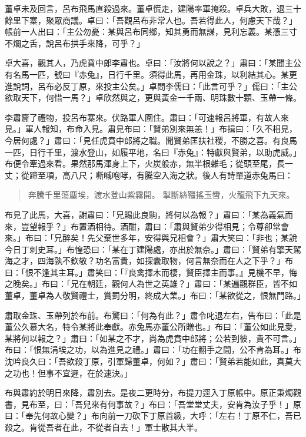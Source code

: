 董卓未及回言，呂布飛馬直殺過來。董卓慌走，建陽率軍掩殺。卓兵大敗，退三十餘里下寨，聚眾商議。卓曰：「吾觀呂布非常人也。吾若得此人，何慮天下哉？」帳前一人出曰：「主公勿憂：某與呂布同鄉，知其勇而無謀，見利忘義。某憑三寸不爛之舌，說呂布拱手來降，可乎？」

卓大喜，觀其人，乃虎賁中郎李肅也。卓曰：「汝將何以說之？」肅曰：「某聞主公有名馬一匹，號曰『赤兔』，日行千里。須得此馬，再用金珠，以利結其心。某更進說詞，呂布必反丁原，來投主公矣。」卓問李儒曰：「此言可乎？」儒曰：「主公欲取天下，何惜一馬？」卓欣然與之，更與黃金一千兩、明珠數十顆、玉帶一條。

李肅齎了禮物，投呂布寨來。伏路軍人圍住。肅曰：「可速報呂將軍，有故人來見。」軍人報知，布命入見。肅見布曰：「賢弟別來無恙！」布揖曰：「久不相見，今居何處？」肅曰：「見任虎賁中郎將之職。聞賢弟匡扶社稷，不勝之喜。有良馬一匹，日行千里，渡水登山，如履平地，名曰『赤兔』：特獻與賢弟，以助虎威。」布便令牽過來看。果然那馬渾身上下，火炭般赤，無半根雜毛；從頭至尾，長一丈；從蹄至項，高八尺；嘶喊咆哮，有騰空入海之狀。後人有詩單道赤兔馬曰：

\begin{quote}
奔騰千里蕩塵埃，渡水登山紫霧開。
掣斷絲韁搖玉轡，火龍飛下九天來。
\end{quote}

布見了此馬，大喜，謝肅曰：「兄賜此良駒，將何以為報？」肅曰：「某為義氣而來，豈望報乎？」布置酒相待。酒酣，肅曰：「肅與賢弟少得相見；令尊卻常會來。」布曰：「兄醉矣！先父棄世多年，安得與兄相會？」肅大笑曰：「非也；某說今日丁刺史耳。」布惶恐曰：「某在丁建陽處，亦出於無奈。」肅曰：「賢弟有擎天駕海之才，四海孰不欽敬？功名富貴，如探囊取物，何言無奈而在人之下乎？」布曰：「恨不逢其主耳。」肅笑曰：「『良禽擇木而棲，賢臣擇主而事。』見機不早，悔之晚矣。」布曰：「兄在朝廷，觀何人為世之英雄？」肅曰：「某遍觀群臣，皆不如董卓，董卓為人敬賢禮士，賞罰分明，終成大業。」布曰：「某欲從之，恨無門路。」

肅取金珠、玉帶列於布前。布驚曰：「何為有此？」肅令叱退左右，告布曰：「此是董公久慕大名，特令某將此奉獻。赤兔馬亦董公所贈也。」布曰：「董公如此見愛，某將何以報之？」肅曰：「如某之不才，尚為虎賁中郎將；公若到彼，貴不可言。」布曰：「恨無涓埃之功，以為進見之禮。」肅曰：「功在翻手之間，公不肯為耳。」布沈吟良久曰：「吾欲殺丁原，引軍歸董卓，何如？」肅曰：「賢弟若能如此，真莫大之功也！但事不宜遲，在於速決。」

布與肅約於明日來降，肅別去。是夜二更時分，布提刀逕入丁原帳中。原正秉燭觀書，見布至，曰：「吾兒來有何事故？」布曰：「吾堂堂丈夫，安肯為汝子乎！」原曰：「奉先何故心變？」布向前一刀砍下丁原首級，大呼：「左右！丁原不仁，吾已殺之。肯從吾者在此，不從者自去！」軍士散其大半。

